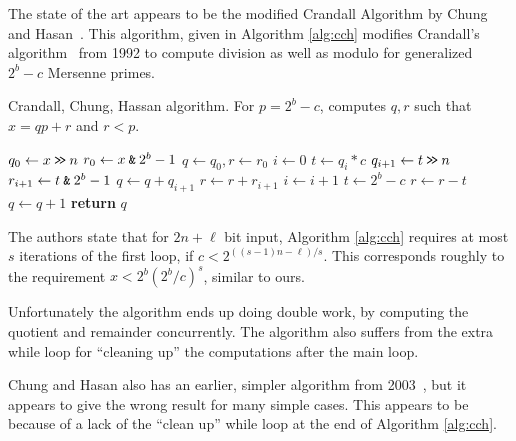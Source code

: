 

The state of the art appears to be the modified Crandall Algorithm by Chung and Hasan~\cite{chung2006low}.
This algorithm, given in Algorithm \ref{alg:cch} modifies Crandall's algorithm~\cite{crandall1992method} from 1992 to compute division as well as modulo for generalized $2^b-c$ Mersenne primes.
\begin{algorithm}[H]
   \caption{Crandall, Chung, Hassan algorithm. For $p=2^b-c$, computes $q, r$ such that $x = qp+r$ and $r<p$.}
   \label{alg:cch}
   \begin{algorithmic}
         \State $q_0 \gets x \mathbin{\texttt{>\!>}} n $
         \State $r_0 \gets x \mathbin{\texttt{\&}} 2^b-1$
         \State $q \gets q_0, r\gets r_0$
         \State $i \gets 0$
            \State $t \gets q_i*c$
            \State $q_{i+1} \gets t \mathbin{\texttt{>\!>}} n$
            \State $r_{i+1} \gets t \mathbin{\texttt{\&}} {2^b -1}$
            \State $q\gets q+q_{i+1}$
            \State $r\gets r+r_{i+1}$
            \State $i\gets i+1$
         \EndWhile
         \State $t \gets 2^b-c$
            \State $r\gets r-t$
            \State $q\gets q+1$
         \EndWhile
         \State\textbf{return} $q$
   \end{algorithmic}
\end{algorithm}
The authors state that for $2n+\ell$ bit input, Algorithm \ref{alg:cch}
requires at most $s$ iterations of the first loop, if $c < 2^{((s-1)n-\ell)/s}$.
This corresponds roughly to the requirement $x < 2^b (2^b/c)^s$, similar to ours.

Unfortunately the algorithm ends up doing double work, by computing the quotient and remainder concurrently.
The algorithm also suffers from the extra while loop for ``cleaning up'' the computations after the main loop.





Chung and Hasan also has an earlier, simpler algorithm from 2003~\cite{chung2003more},
but it appears to give the wrong result for many simple cases.
This appears to be because of a lack of the ``clean up'' while loop at the end of Algorithm \ref{alg:cch}.

